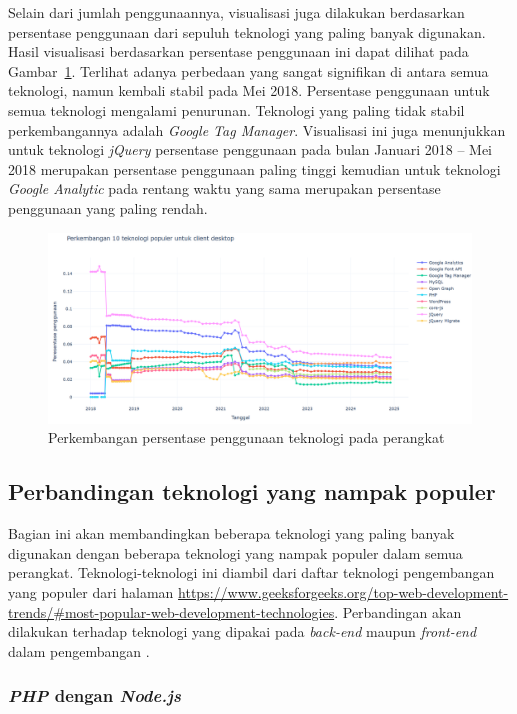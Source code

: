 Selain dari jumlah penggunaannya, visualisasi juga dilakukan berdasarkan persentase penggunaan dari sepuluh teknologi yang paling banyak digunakan. Hasil visualisasi berdasarkan persentase penggunaan ini dapat dilihat pada Gambar~\ref{fig:persentasedesktopreal}. Terlihat adanya perbedaan yang sangat signifikan di antara semua teknologi, namun kembali stabil pada Mei 2018. Persentase penggunaan untuk semua teknologi mengalami penurunan. Teknologi yang paling tidak stabil perkembangannya adalah \textit{Google Tag Manager}. Visualisasi ini juga menunjukkan untuk teknologi \textit{jQuery} persentase penggunaan pada bulan Januari 2018 -- Mei 2018 merupakan persentase penggunaan paling tinggi kemudian untuk teknologi \textit{Google Analytic} pada rentang waktu yang sama merupakan persentase penggunaan yang paling rendah.

\begin{figure}[H]
    \centering
    \includegraphics[width=0.7\linewidth]{Gambar/Perkembangan persentase desktop real.png}
    \caption{Perkembangan persentase penggunaan teknologi pada perangkat \desktop }
    \label{fig:persentasedesktopreal}
\end{figure}

\subsection{Perbandingan teknologi yang nampak populer}
\label{subsec:teknologipopulerlain}

Bagian ini akan membandingkan beberapa teknologi yang paling banyak digunakan dengan beberapa teknologi yang nampak populer dalam semua perangkat. Teknologi-teknologi ini diambil dari daftar teknologi pengembangan \web yang populer dari halaman \url{https://www.geeksforgeeks.org/top-web-development-trends/#most-popular-web-development-technologies}. Perbandingan akan dilakukan terhadap teknologi yang dipakai pada \textit{back-end} maupun \textit{front-end} dalam pengembangan \web.

\subsubsection{\textit{PHP} dengan \textit{Node.js}}
\label{subsubsec:phpnode}

